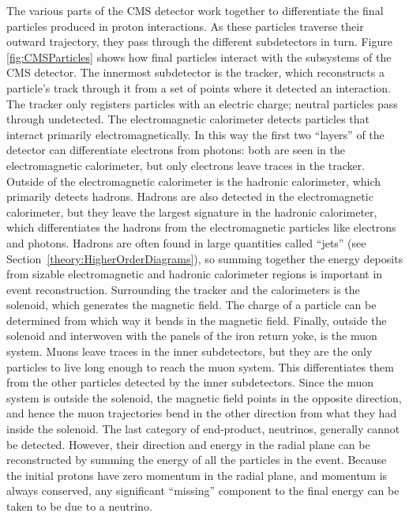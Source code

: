 The various parts of the CMS detector work together to differentiate
the final particles produced in proton interactions.  
As 
these %
particles traverse their outward trajectory,
they pass through the different subdetectors in turn.
Figure \ref{fig:CMSParticles} shows how 
final %
particles 
interact with the subsystems of the CMS detector.  
The innermost subdetector is the tracker, 
which reconstructs a particle's track through it
from a set of points where it detected an interaction.  
The tracker only registers particles with an electric charge; %
neutral particles pass through undetected.  
The electromagnetic calorimeter detects particles that interact
primarily electromagnetically. %
In this way the first two ``layers'' of the detector can differentiate
electrons from photons: 
both are seen in the electromagnetic calorimeter, 
but only electrons leave traces in the tracker.
Outside of the electromagnetic calorimeter is the hadronic calorimeter,
which primarily detects hadrons.  
Hadrons are also detected in the electromagnetic calorimeter,
but they leave the largest signature in the hadronic calorimeter,
which differentiates the hadrons from the electromagnetic particles
like electrons and photons.  
Hadrons are often found in large quantities called ``jets'' 
(see Section~\ref{theory:HigherOrderDiagrams}),
so summing together the energy deposits from sizable electromagnetic 
and hadronic calorimeter regions is important in event reconstruction.  
Surrounding the tracker and the calorimeters is the solenoid,
which generates the magnetic field.
The charge of a particle can be determined from which way it
bends in the magnetic field.
Finally, outside the solenoid and interwoven with the panels of the 
iron return yoke, is the muon system.  
Muons leave traces in the inner subdetectors, 
but they are the only particles to live long enough to reach the
muon system.
This differentiates them from the other particles detected by 
the inner subdetectors.  
Since the muon system is outside the solenoid, 
the magnetic field points in the opposite direction,
and hence the muon trajectories bend in the other direction
from what they had inside the solenoid.  
The last category of end-product, neutrinos, 
generally cannot be detected.
However, their direction and energy in the radial plane 
can be reconstructed 
by summing the energy of all the particles in the event.
Because the initial protons have zero momentum in the radial plane, 
and momentum is always conserved, 
any significant ``missing'' component to the final energy
can be taken to be due to a neutrino.  

